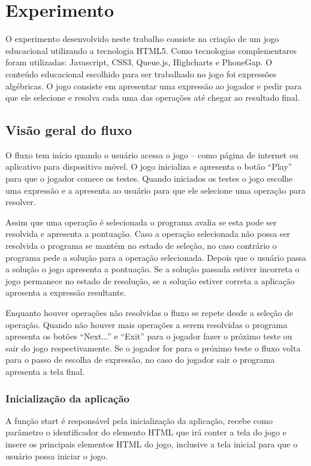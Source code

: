 \part{Experimento}
O experimento desenvolvido neste trabalho consiste na criação de um jogo educacional utilizando a tecnologia HTML5. Como tecnologias complementares foram utilizadas: Javascript, CSS3, Queue.js, Highcharts e PhoneGap. O conteúdo educacional escolhido para ser trabalhado no jogo foi expressões algébricas. O jogo consiste em apresentar uma expressão ao jogador e pedir para que ele selecione e resolva cada uma das operações até chegar ao resultado final.

\chapter{Visão geral do fluxo}
O fluxo tem início quando o usuário acessa o jogo – como página de internet ou aplicativo para dispositivo móvel. O jogo inicializa e apresenta o botão “Play” para que o jogador comece os testes. Quando iniciados os testes o jogo escolhe uma expressão e a apresenta ao usuário para que ele selecione uma operação para resolver.

Assim que uma operação é selecionada o programa avalia se esta pode ser resolvida e apresenta a pontuação. Caso a operação selecionada não possa ser resolvida o programa se mantém no estado de seleção, no caso contrário o programa pede a solução para a operação selecionada. Depois que o usuário passa a solução o jogo apresenta a pontuação. Se a solução passada estiver incorreta o jogo permanece no estado de resolução, se a solução estiver correta a aplicação apresenta a expressão resultante.

Enquanto houver operações não resolvidas o fluxo se repete desde a seleção de operação. Quando não houver mais operações a serem resolvidas o programa apresenta os botões “Next...” e “Exit” para o jogador fazer o próximo teste ou sair do jogo respectivamente. Se o jogador for para o próximo teste o fluxo volta para o passo de escolha de expressão, no caso do jogador sair o programa apresenta a tela final.

\section{Inicialização da aplicação}
A função start é responsável pela inicialização da aplicação, recebe como parâmetro o identificador do elemento HTML que irá conter a tela do jogo e insere os principais elementos HTML do jogo, inclusive a tela inicial para que o usuário possa iniciar o jogo.


